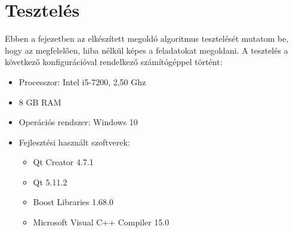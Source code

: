 \chapter{Tesztelés}
Ebben a fejezetben az elkészített megoldó algoritmus tesztelését mutatom be, hogy az megfelelően, hiba nélkül képes a feladatokat megoldani.
A tesztelés a következő konfigurációval rendelkező számítógéppel történt:
\begin{itemize}
	\item Processzor: Intel i5-7200, 2,50 Ghz
	\item 8 GB RAM
	\item Operációs rendszer: Windows 10
	\item Fejlesztési használt szoftverek:
		\begin{itemize}
			\item Qt Creator 4.7.1
			\item Qt 5.11.2
			\item Boost Libraries 1.68.0
			\item Microsoft Visual C++ Compiler 15.0 
		\end{itemize}		 
\end{itemize}


